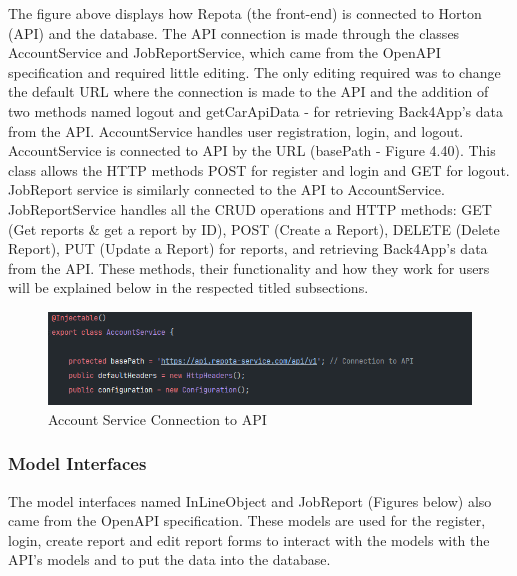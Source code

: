 The figure above displays how Repota (the front-end) is connected to Horton (API) and the database. The API connection is made through the classes AccountService and JobReportService, which came from the OpenAPI specification and required little editing. The only editing required was to change the default URL where the connection is made to the API and the addition of two methods named logout and getCarApiData - for retrieving Back4App's data from the API. AccountService handles user registration, login, and logout. AccountService is connected to API by the URL (basePath - Figure 4.40). This class allows the HTTP methods POST for register and login and GET for logout. JobReport service is similarly connected to the API to AccountService. JobReportService handles all the CRUD operations and HTTP methods: GET (Get reports \& get a report by ID), POST (Create a Report), DELETE (Delete Report), PUT (Update a Report) for reports, and retrieving Back4App's data from the API. These methods, their functionality and how they work for users will be explained below in the respected titled subsections.

\begin{figure}[H]
    \caption{Account Service Connection to API}
    \label{image:a-s-conn}
    \centering
    \includegraphics[width=1.0\textwidth]{images/repota_and_horton/account_service.png}
\end{figure}

\subsubsection{Model Interfaces}
The model interfaces named InLineObject and JobReport (Figures below) also came from the OpenAPI specification. These models are used for the register, login, create report and edit report forms to interact with the models with the API's models and to put the data into the database. 

